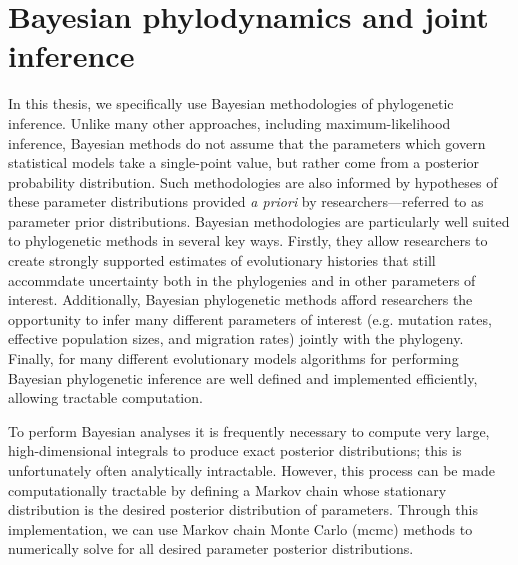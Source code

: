 \section{Bayesian phylodynamics and joint inference}

In this thesis, we specifically use Bayesian methodologies of phylogenetic inference.
Unlike many other approaches, including maximum-likelihood inference, Bayesian methods do not assume that the parameters which govern statistical models take a single-point value, but rather come from a posterior probability distribution.
Such methodologies are also informed by hypotheses of these parameter distributions provided \textit{a priori} by researchers---referred to as parameter prior distributions.
Bayesian methodologies are particularly well suited to phylogenetic methods in several key ways.
Firstly, they allow researchers to create strongly supported estimates of evolutionary histories that still accommdate uncertainty both in the phylogenies and in other parameters of interest.
Additionally, Bayesian phylogenetic methods afford researchers the opportunity to infer many different parameters of interest (e.g. mutation rates, effective population sizes, and migration rates) jointly with the phylogeny.
Finally, for many different evolutionary models algorithms for performing Bayesian phylogenetic inference are well defined and implemented efficiently, allowing tractable computation.

To perform Bayesian analyses it is frequently necessary to compute very large, high-dimensional integrals to produce exact posterior distributions; this is unfortunately often analytically intractable.
However, this process can be made computationally tractable by defining a Markov chain whose stationary distribution is the desired posterior distribution of parameters.
Through this implementation, we can use Markov chain Monte Carlo (\gls{mcmc}) methods to numerically solve for all desired parameter posterior distributions.

